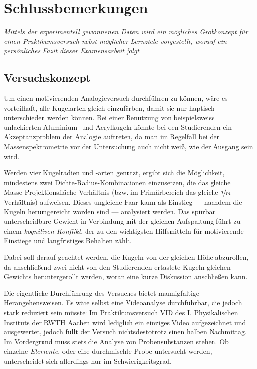 \chapter{Schlussbemerkungen}
\label{kap:6}

\textit{Mittels der experimentell gewonnenen Daten wird ein mögliches Grobkonzept für einen Praktikumsversuch nebst möglicher Lernziele vorgestellt, worauf ein persönliches Fazit dieser Examensarbeit folgt}

\section{Versuchskonzept}

Um einen motivierenden Analogieversuch durchführen zu können, wäre es vorteilhaft, alle Kugelarten gleich einzufärben, damit sie nur haptisch unterschieden werden können. Bei einer Benutzung von beispielsweise unlackierten Aluminium- und Acrylkugeln könnte bei den Studierenden ein Akzeptanzproblem der Analogie auftreten, da man im Regelfall bei der Massenspektrometrie vor der Untersuchung auch nicht weiß, wie der Ausgang sein wird.

Werden vier Kugelradien und -arten genutzt, ergibt sich die Möglichkeit, mindestens zwei Dichte-Radius-Kombinationen einzusetzen, die das gleiche Masse-Projektionsfläche-Verhältnis (bzw. im Primärbereich das gleiche $\sfrac{q}{m}$-Verhältnis) aufweisen. Dieses ungleiche Paar kann als Einstieg --- nachdem die Kugeln herumgereicht worden sind --- analysiert werden. Das spürbar unterscheidbare Gewicht in Verbindung mit der gleichen Aufspaltung führt zu einem \textit{kognitiven Konflikt}, der zu den wichtigsten Hilfsmitteln für motivierende Einstiege und langfristiges Behalten zählt. 

Dabei soll darauf geachtet werden, die Kugeln von der gleichen Höhe abzurollen, da anschließend zwei nicht von den Studierenden ertastete Kugeln gleichen Gewichts heruntergerollt werden, woran eine kurze Diskussion anschließen kann. 

Die eigentliche Durchführung des Versuches bietet mannigfaltige Herangehensweisen. Es wäre selbst eine Videoanalyse durchführbar, die jedoch stark reduziert sein müsste: Im Praktikumsversuch \textsc{VID} des I. Physikalischen Instituts der RWTH Aachen wird lediglich ein einziges Video aufgezeichnet und ausgewertet, jedoch füllt der Versuch nichtsdestotrotz einen halben Nachmittag. Im Vordergrund muss stets die Analyse von Probensubstanzen stehen. Ob einzelne \textit{Elemente}, oder eine durchmischte Probe untersucht werden, unterscheidet sich allerdings nur im Schwierigkeitsgrad. 


